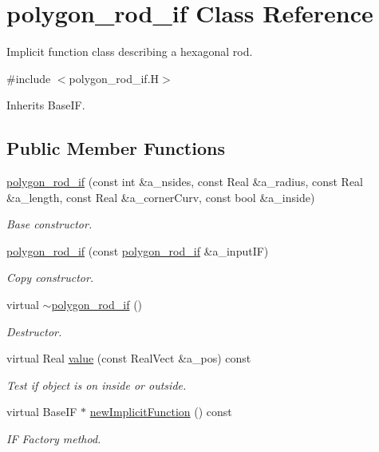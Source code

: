 \hypertarget{classpolygon__rod__if}{}\section{polygon\+\_\+rod\+\_\+if Class Reference}
\label{classpolygon__rod__if}


Implicit function class describing a hexagonal rod.  




{\ttfamily \#include $<$polygon\+\_\+rod\+\_\+if.\+H$>$}



Inherits Base\+IF.

\subsection*{Public Member Functions}
\begin{DoxyCompactItemize}
\item 
\hyperlink{classpolygon__rod__if_a1ffb464897e78c1e887dd09da0183318}{polygon\+\_\+rod\+\_\+if} (const int \&a\+\_\+nsides, const Real \&a\+\_\+radius, const Real \&a\+\_\+length, const Real \&a\+\_\+corner\+Curv, const bool \&a\+\_\+inside)
\begin{DoxyCompactList}\small\item\em Base constructor. \end{DoxyCompactList}\item 
\hyperlink{classpolygon__rod__if_aa0075ecc39df3ab629f0d4137159f3a3}{polygon\+\_\+rod\+\_\+if} (const \hyperlink{classpolygon__rod__if}{polygon\+\_\+rod\+\_\+if} \&a\+\_\+input\+IF)
\begin{DoxyCompactList}\small\item\em Copy constructor. \end{DoxyCompactList}\item 
virtual \hyperlink{classpolygon__rod__if_af405f7421b591ba7d579df88b45777ba}{$\sim$polygon\+\_\+rod\+\_\+if} ()
\begin{DoxyCompactList}\small\item\em Destructor. \end{DoxyCompactList}\item 
virtual Real \hyperlink{classpolygon__rod__if_a1109016c96aa9a7f44022f276aa90e92}{value} (const Real\+Vect \&a\+\_\+pos) const 
\begin{DoxyCompactList}\small\item\em Test if object is on inside or outside. \end{DoxyCompactList}\item 
virtual Base\+IF $\ast$ \hyperlink{classpolygon__rod__if_a14a5f0e16e9a785e1eba7341b0f419c7}{new\+Implicit\+Function} () const 
\begin{DoxyCompactList}\small\item\em IF Factory method. \end{DoxyCompactList}\end{DoxyCompactItemize}

